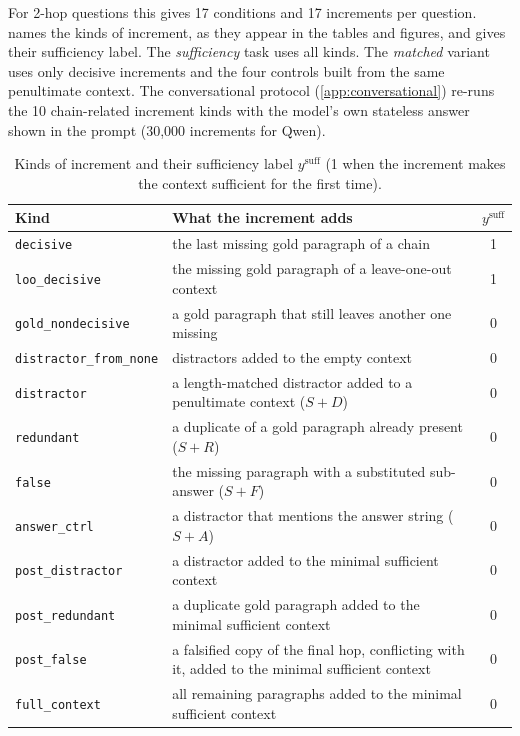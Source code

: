 For 2-hop questions this gives 17 conditions and 17 increments per question.  names the kinds of increment, as they appear in the tables and figures, and gives their sufficiency label. The \emph{sufficiency} task uses all kinds. The \emph{matched} variant uses only decisive increments and the four controls built from the same penultimate context. The conversational protocol (\cref{app:conversational}) re-runs the 10 chain-related increment kinds with the model's own stateless answer shown in the prompt (30{,}000 increments for Qwen).

\begin{table}[t]
\centering\small
\begin{tabular}{lp{9cm}c}
\toprule
Kind & What the increment adds & $y^{\mathrm{suff}}$ \\
\midrule
\texttt{decisive} & the last missing gold paragraph of a chain & 1 \\
\texttt{loo\_decisive} & the missing gold paragraph of a leave-one-out context & 1 \\
\texttt{gold\_nondecisive} & a gold paragraph that still leaves another one missing & 0 \\
\texttt{distractor\_from\_none} & distractors added to the empty context & 0 \\
\texttt{distractor} & a length-matched distractor added to a penultimate context ($S{+}D$) & 0 \\
\texttt{redundant} & a duplicate of a gold paragraph already present ($S{+}R$) & 0 \\
\texttt{false} & the missing paragraph with a substituted sub-answer ($S{+}F$) & 0 \\
\texttt{answer\_ctrl} & a distractor that mentions the answer string ($S{+}A$) & 0 \\
\texttt{post\_distractor} & a distractor added to the minimal sufficient context & 0 \\
\texttt{post\_redundant} & a duplicate gold paragraph added to the minimal sufficient context & 0 \\
\texttt{post\_false} & a falsified copy of the final hop, conflicting with it, added to the minimal sufficient context & 0 \\
\texttt{full\_context} & all remaining paragraphs added to the minimal sufficient context & 0 \\
\bottomrule
\end{tabular}
\caption{Kinds of increment and their sufficiency label $y^{\mathrm{suff}}$ (1 when the increment makes the context sufficient for the first time).}
\label{tab:kinds}
\end{table}
